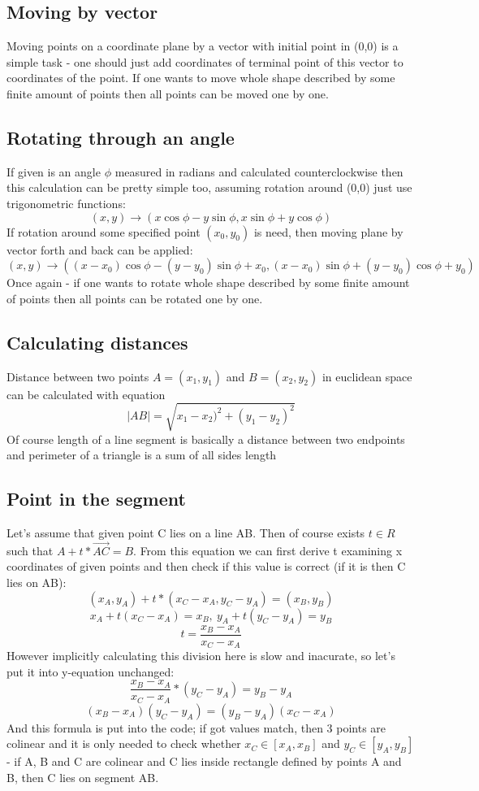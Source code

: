 \documentclass{article}
\begin{document}
\subsection{Moving by vector}
Moving points on a coordinate plane by a vector with initial point in (0,0) is a simple task - one should just add coordinates of terminal point of this vector to coordinates of the point. If one wants to move whole shape described by some finite amount of points then all points can be moved one by one.
\subsection{Rotating through an angle}
If given is an angle $ \phi $ measured in radians and calculated counterclockwise then this calculation can be pretty simple too, assuming rotation around (0,0) just use trigonometric functions: 
$$ (x,y) \rightarrow  (x\cos\phi-y\sin\phi, x\sin\phi+y\cos\phi) $$
If rotation around some specified point $ (x_0,y_0) $ is need, then moving plane by vector forth and back can be applied:
$$ (x,y) \rightarrow ((x-x_0)\cos\phi-(y-y_0)\sin\phi + x_0, (x-x_0)\sin\phi+(y-y_0)\cos\phi + y_0) $$
Once again - if one wants to rotate whole shape described by some finite amount of points then all points can be rotated one by one.
\subsection{Calculating distances}
Distance between two points $ A = (x_1,y_1) $ and $ B = (x_2,y_2) $ in euclidean space can be calculated with equation 
$$ |AB| = \sqrt{x_1-x_2)^2+(y_1-y_2)^2} $$
Of course length of a line segment is basically a distance between two endpoints and perimeter of a triangle is a sum of all sides length
\subsection{Point in the segment}
Let's assume that given point C lies on a line AB. Then of course exists $ t\in R$ such that $ A + t*\Vec{AC} = B $. From this equation we can first derive t examining x coordinates of given points and then check if this value is correct (if it is then C lies on AB):
$$ (x_A, y_A) + t*(x_C-x_A, y_C-y_A) = (x_B, y_B) $$
$$ x_A + t(x_C-x_A) = x_B,\:y_A + t(y_C-y_A)=y_B $$
$$ t = \frac{x_B-x_A}{x_C-x_A}$$
However implicitly calculating this division here is slow and inacurate, so let's put it into y-equation unchanged:
$$ \frac{x_B-x_A}{x_C-x_A} * (y_C-y_A) = y_B-y_A$$
$$ (x_B-x_A)(y_C-y_A)=(y_B-y_A)(x_C-x_A) $$
And this formula is put into the code; if got values match, then 3 points are colinear and it is only needed to check whether $ x_C \in [x_A,x_B] $ and $ y_C \in [y_A,y_B] $ - if A, B and C are colinear and C lies inside rectangle defined by points A and B, then C lies on segment AB.
\end{document}
